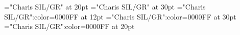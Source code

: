 \documentclass[a4paper]{article}
\begin{document}
\pagestyle{plain}
\sloppy
\setlength{\parfillskip}{0pt plus 1fil}
\font\xitemen="Charis SIL/GR" at 20pt
\font\xitempt="Charis SIL/GR" at 30pt
\font\entry="Charis SIL/GR":color=0000FF at 12pt
\font\xitemptentry="Charis SIL/GR":color=0000FF at 30pt
\font\xitemenentry="Charis SIL/GR":color=0000FF at 20pt

\mbox{} 
\newpage 
\newpage 
\setcounter{page}{1} 
\pagestyle{fancy} 

\end{document}
